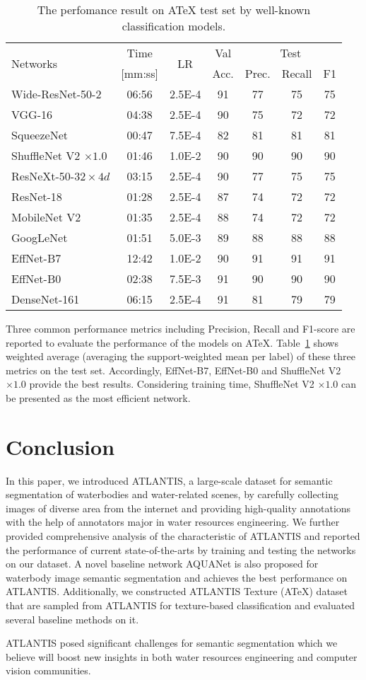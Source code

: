 \documentclass{article}
\begin{document}
\begin{table}
\centering
    \small
    \caption{The perfomance result on ATeX test set by well-known classification models.}
    \label{tab:model_results}
    \begin{tabular}{lcccccc}
        \toprule
        \multirow{2}{1pt}{Networks} & Time & \multirow{2}{*}{LR} & Val & \multicolumn{3}{c}{Test} \\
            & [mm:ss] &   & Acc. & Prec. & Recall & F1 \\
        \midrule
        Wide-ResNet-50-2 & 06:56 & 2.5E-4 & 91 & 77 & 75 & 75\\
        VGG-16 & 04:38 & 2.5E-4 & 90 & 75 & 72 & 72\\
        SqueezeNet & 00:47 & 7.5E-4 & 82 & 81 & 81 & 81\\
        ShuffleNet V2 $\times 1.0$ & 01:46 & 1.0E-2 & 90 & 90 & 90 & 90\\
        ResNeXt-50-$32 \times 4d$ & 03:15 & 2.5E-4 & 90 & 77 & 75 & 75\\
        ResNet-18 & 01:28 & 2.5E-4 & 87 & 74 & 72 & 72\\
        MobileNet V2 & 01:35 & 2.5E-4 & 88 & 74 & 72 & 72\\
        GoogLeNet & 01:51 & 5.0E-3 & 89 & 88 & 88 & 88\\
        EffNet-B7 & 12:42 & 1.0E-2 & 90 & 91 & 91 & 91\\
        EffNet-B0 & 02:38 & 7.5E-3 & 91 & 90 & 90 & 90\\
        DenseNet-161 & 06:15 & 2.5E-4 & 91 & 81 & 79 & 79\\
        \bottomrule
    \end{tabular}
\end{table}

Three common performance metrics including Precision, Recall and F1-score are reported to evaluate the performance of the models on ATeX. Table~\ref{tab:model_results} shows weighted average (averaging the support-weighted mean per label) of these three metrics on the test set. Accordingly, EffNet-B7, EffNet-B0 and ShuffleNet V2 $\times 1.0$ provide the best results. Considering training time, ShuffleNet V2 $\times 1.0$ can be presented as the most efficient network.

\section{Conclusion} \label{sec:conclusion}
In this paper, we introduced ATLANTIS, a large-scale dataset for semantic segmentation of waterbodies and water-related scenes, by carefully collecting images of diverse area from the internet and providing high-quality annotations with the help of annotators major in water resources engineering. We further provided comprehensive analysis of the characteristic of ATLANTIS and reported the performance of current state-of-the-arts by training and testing the networks on our dataset. A novel baseline network AQUANet is also proposed for waterbody image semantic segmentation and achieves the best performance on ATLANTIS. Additionally, we constructed ATLANTIS Texture (ATeX) dataset that are sampled from ATLANTIS for texture-based classification and evaluated several baseline methods on it.

ATLANTIS posed significant challenges for semantic segmentation which we believe will boost new insights in both water resources engineering and computer vision communities.



  

\end{document}
